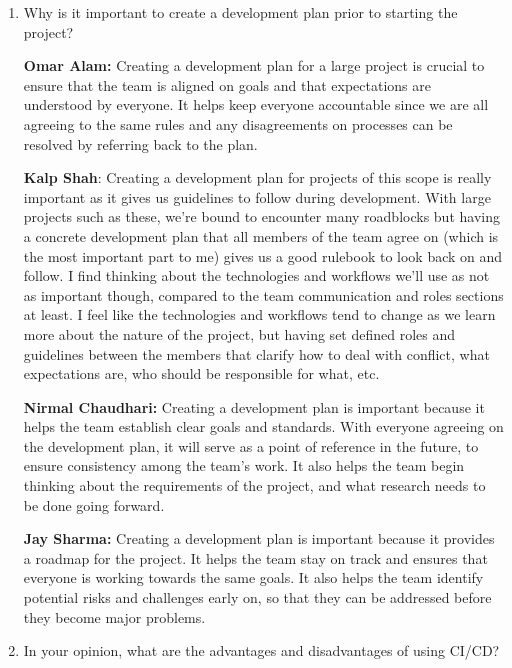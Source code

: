 \documentclass{article}
\begin{document}
\begin{enumerate}
    \item Why is it important to create a development plan prior to starting the
    project?

    \textbf{Omar Alam:} Creating a development plan for a large project is crucial to ensure that the team is aligned on goals
    and that expectations are understood by everyone. It helps keep everyone accountable since we are all agreeing to the same rules
    and any disagreements on processes can be resolved by referring back to the plan.

    \textbf{Kalp Shah}: Creating a development plan for projects of this scope is really important as it gives us guidelines to follow
    during development. With large projects such as these, we're bound to encounter many roadblocks but having a concrete development 
    plan that all members of the team agree on (which is the most important part to me) gives us a good rulebook to look back on and 
    follow. I find thinking about the technologies and workflows we'll use as not as important though, compared to the team communication 
    and roles sections at least. I feel like the technologies and workflows tend to change as we learn more about the nature of the 
    project, but having set defined roles and guidelines between the members that clarify how to deal with conflict, what expectations 
    are, who should be responsible for what, etc. 
    
    \textbf{Nirmal Chaudhari:} Creating a development plan is important because it helps the team establish clear goals and standards. 
    With everyone agreeing on the development plan, it will serve as a point of reference in the future, to ensure consistency among the team's work. 
    It also helps the team begin thinking about the requirements of the project, and what research needs to be done going forward. 

    \textbf{Jay Sharma:} Creating a development plan is important because it provides a roadmap for the project. It helps the team stay on track 
    and ensures that everyone is working towards the same goals. It also helps the team identify potential risks and challenges early on, so that 
    they can be addressed before they become major problems.
    \item In your opinion, what are the advantages and disadvantages of using
    CI/CD?


\end{enumerate}
\end{document}
